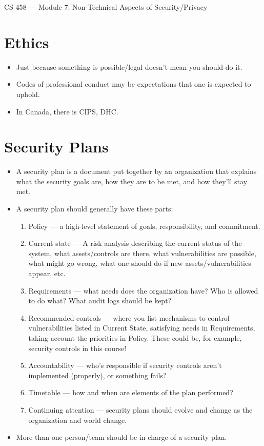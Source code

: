 \documentclass{article}
\author{Clement Tsang}
\begin{document}
\begin{center}
    \Large{CS 458 --- Module 7: Non-Technical Aspects of Security/Privacy}
\end{center}

\section{Ethics}
\begin{itemize}
    \item Just because something is possible/legal doesn't mean you should do it.
    \item Codes of professional conduct may be expectations that one is expected to uphold.
    \item In Canada, there is CIPS, DHC.
\end{itemize}


\section{Security Plans}
\begin{itemize}
    \item A security plan is a document put together by an organization that explains what the security goals are, how they are to be met, and how they'll stay met.
    \item A security plan should generally have these parts:
        \begin{enumerate}
            \item Policy --- a high-level statement of goals, responsibility, and commitment.
            \item Current state --- A risk analysis describing the current status of the system, what assets/controls are there, what vulnerabilities are possible, what might go wrong, what one should do if new assets/vulnerabilities appear, etc.
            \item Requirements --- what needs does the organization have?  Who is allowed to do what?  What audit logs should be kept?
            \item Recommended controls --- where you list mechanisms to control vulnerabilities listed in Current State, satisfying needs in Requirements, taking account the priorities in Policy.  These could be, for example, security controls in this course!
            \item Accountability --- who's responsible if security controls aren't implemented (properly), or something fails?
            \item Timetable --- how and when are elements of the plan performed?
            \item Continuing attention --- security plans should evolve and change as the organization and world change.
        \end{enumerate}
    \item More than one person/team should be in charge of a security plan.
\end{itemize}
\end{document}

